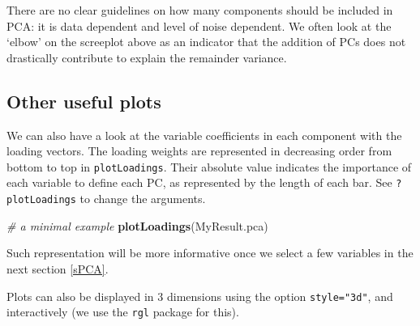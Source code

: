 \documentclass[]{book}
\newenvironment{Shaded}{\begin{snugshade}}{\end{snugshade}}
\newcommand{\CommentTok}[1]{\textcolor[rgb]{0.56,0.35,0.01}{\textit{#1}}}
\newcommand{\DataTypeTok}[1]{\textcolor[rgb]{0.13,0.29,0.53}{#1}}
\newcommand{\DecValTok}[1]{\textcolor[rgb]{0.00,0.00,0.81}{#1}}
\newcommand{\FloatTok}[1]{\textcolor[rgb]{0.00,0.00,0.81}{#1}}
\newcommand{\KeywordTok}[1]{\textcolor[rgb]{0.13,0.29,0.53}{\textbf{#1}}}
\newcommand{\NormalTok}[1]{#1}
\newcommand{\OperatorTok}[1]{\textcolor[rgb]{0.81,0.36,0.00}{\textbf{#1}}}
\newcommand{\OtherTok}[1]{\textcolor[rgb]{0.56,0.35,0.01}{#1}}
\newcommand{\StringTok}[1]{\textcolor[rgb]{0.31,0.60,0.02}{#1}}
\begin{document}
There are no clear guidelines on how many components should be included in PCA: it is data dependent and level of noise dependent. We often look at the `elbow' on the screeplot above as an indicator that the addition of PCs does not drastically contribute to explain the remainder variance.

\hypertarget{other-useful-plots}{%
\subsection{Other useful plots}\label{other-useful-plots}}

We can also have a look at the variable coefficients in each component with the loading vectors. The loading weights are represented in decreasing order from bottom to top in \texttt{plotLoadings}. Their absolute value indicates the importance of each variable to define each PC, as represented by the length of each bar. See \texttt{?plotLoadings} to change the arguments.

\begin{Shaded}
\begin{Highlighting}[]
\CommentTok{# a minimal example}
\KeywordTok{plotLoadings}\NormalTok{(MyResult.pca)}
\end{Highlighting}
\end{Shaded}

\begin{Shaded}
\end{Shaded}

Such representation will be more informative once we select a few variables in the next section \ref{sPCA}.

Plots can also be displayed in 3 dimensions using the option \texttt{style="3d"}, and interactively (we use the \texttt{rgl} package for this).

\begin{Shaded}
\end{Shaded}
\end{document}
